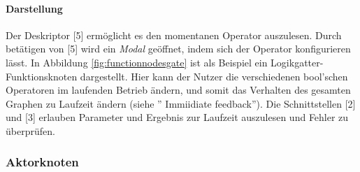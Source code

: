 \paragraph{Darstellung}  Der Deskriptor [5] ermöglicht es den momentanen Operator auszulesen. Durch betätigen von [5] wird ein \textit{Modal} geöffnet, indem sich der Operator konfigurieren lässt. In Abbildung \ref{fig:functionnodesgate} ist als Beispiel ein Logikgatter-Funktionsknoten dargestellt. Hier kann der Nutzer die verschiedenen bool'schen Operatoren im laufenden Betrieb ändern, und somit das Verhalten des gesamten Graphen zu Laufzeit ändern (siehe '' Immiidiate feedback''). Die Schnittstellen [2] und [3] erlauben Parameter und Ergebnis zur Laufzeit auszulesen und Fehler zu überprüfen.


\subsubsection{Aktorknoten}

